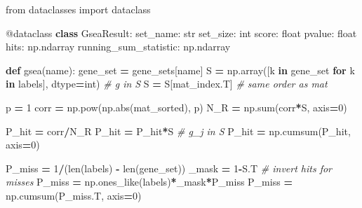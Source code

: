 \documentclass[
]{book}
\newenvironment{Shaded}{\begin{snugshade}}{\end{snugshade}}
\newcommand{\AttributeTok}[1]{\textcolor[rgb]{0.13,0.29,0.53}{#1}}
\newcommand{\BuiltInTok}[1]{#1}
\newcommand{\CommentTok}[1]{\textcolor[rgb]{0.56,0.35,0.01}{\textit{#1}}}
\newcommand{\ControlFlowTok}[1]{\textcolor[rgb]{0.13,0.29,0.53}{\textbf{#1}}}
\newcommand{\DecValTok}[1]{\textcolor[rgb]{0.00,0.00,0.81}{#1}}
\newcommand{\ImportTok}[1]{#1}
\newcommand{\KeywordTok}[1]{\textcolor[rgb]{0.13,0.29,0.53}{\textbf{#1}}}
\newcommand{\NormalTok}[1]{#1}
\newcommand{\OperatorTok}[1]{\textcolor[rgb]{0.81,0.36,0.00}{\textbf{#1}}}
\begin{document}
\begin{Shaded}
\begin{Highlighting}[numbers=left,,]
\ImportTok{from}\NormalTok{ dataclasses }\ImportTok{import}\NormalTok{ dataclass}

\AttributeTok{@dataclass}
\KeywordTok{class}\NormalTok{ GseaResult:}
\NormalTok{    set\_name: }\BuiltInTok{str}
\NormalTok{    set\_size: }\BuiltInTok{int}
\NormalTok{    score: }\BuiltInTok{float}
\NormalTok{    pvalue: }\BuiltInTok{float}
\NormalTok{    hits: np.ndarray}
\NormalTok{    running\_sum\_statistic: np.ndarray}
    
\KeywordTok{def}\NormalTok{ gsea(name):}
\NormalTok{    gene\_set }\OperatorTok{=}\NormalTok{ gene\_sets[name]}
\NormalTok{    S }\OperatorTok{=}\NormalTok{ np.array([k }\KeywordTok{in}\NormalTok{ gene\_set }\ControlFlowTok{for}\NormalTok{ k }\KeywordTok{in}\NormalTok{ labels], dtype}\OperatorTok{=}\BuiltInTok{int}\NormalTok{) }\CommentTok{\# g in S}
\NormalTok{    S }\OperatorTok{=}\NormalTok{ S[mat\_index.T] }\CommentTok{\# same order as mat}

\NormalTok{    p }\OperatorTok{=} \DecValTok{1}
\NormalTok{    corr }\OperatorTok{=}\NormalTok{ np.}\BuiltInTok{pow}\NormalTok{(np.}\BuiltInTok{abs}\NormalTok{(mat\_sorted), p)}
\NormalTok{    N\_R }\OperatorTok{=}\NormalTok{ np.}\BuiltInTok{sum}\NormalTok{(corr}\OperatorTok{*}\NormalTok{S, axis}\OperatorTok{=}\DecValTok{0}\NormalTok{)}

\NormalTok{    P\_hit }\OperatorTok{=}\NormalTok{ corr}\OperatorTok{/}\NormalTok{N\_R}
\NormalTok{    P\_hit }\OperatorTok{=}\NormalTok{ P\_hit}\OperatorTok{*}\NormalTok{S }\CommentTok{\# g\_j in S}
\NormalTok{    P\_hit }\OperatorTok{=}\NormalTok{ np.cumsum(P\_hit, axis}\OperatorTok{=}\DecValTok{0}\NormalTok{)}

\NormalTok{    P\_miss }\OperatorTok{=} \DecValTok{1}\OperatorTok{/}\NormalTok{(}\BuiltInTok{len}\NormalTok{(labels) }\OperatorTok{{-}} \BuiltInTok{len}\NormalTok{(gene\_set))}
\NormalTok{    \_mask }\OperatorTok{=} \DecValTok{1}\OperatorTok{{-}}\NormalTok{S.T }\CommentTok{\# invert hits for misses}
\NormalTok{    P\_miss }\OperatorTok{=}\NormalTok{ np.ones\_like(labels)}\OperatorTok{*}\NormalTok{\_mask}\OperatorTok{*}\NormalTok{P\_miss}
\NormalTok{    P\_miss }\OperatorTok{=}\NormalTok{ np.cumsum(P\_miss.T, axis}\OperatorTok{=}\DecValTok{0}\NormalTok{)}


\end{Highlighting}
\end{Shaded}
\end{document}
